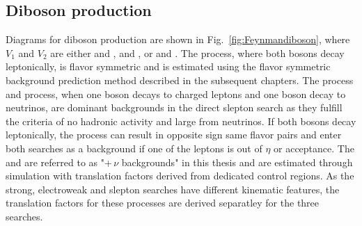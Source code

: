 \subsection*{Diboson production}
\noindent
\justify
Diagrams for diboson production are shown in Fig.~\ref{fig:Feynmandiboson}, where $V_1$ and $V_2$ are either \PW and \PW, \PZ and \PZ, or \PW and \PZ. 
The \PWW process, where both \PW bosons decay leptonically, is flavor symmetric and is estimated using the flavor symmetric background prediction method described in the subsequent chapters. 
The \PZZ process and \PWZ process, when one \PZ boson decays to charged leptons and one \PZ boson decay to neutrinos, are dominant backgrounds in the direct slepton search as they fulfill the criteria of no hadronic activity and large \ptmiss from neutrinos. 
If both bosons decay leptonically, the \PWZ process can result in opposite sign same flavor pairs and enter both searches as a background if one of the leptons is out of $\eta$ or \pt acceptance. 
The \PZZ and \PWZ are referred to as "\PZ+$\,\nu$ backgrounds" in this thesis and are estimated through simulation with translation factors derived from dedicated control regions. 
As the strong, electroweak and slepton searches have different kinematic features, the translation factors for these processes are derived separatley for the three searches.
